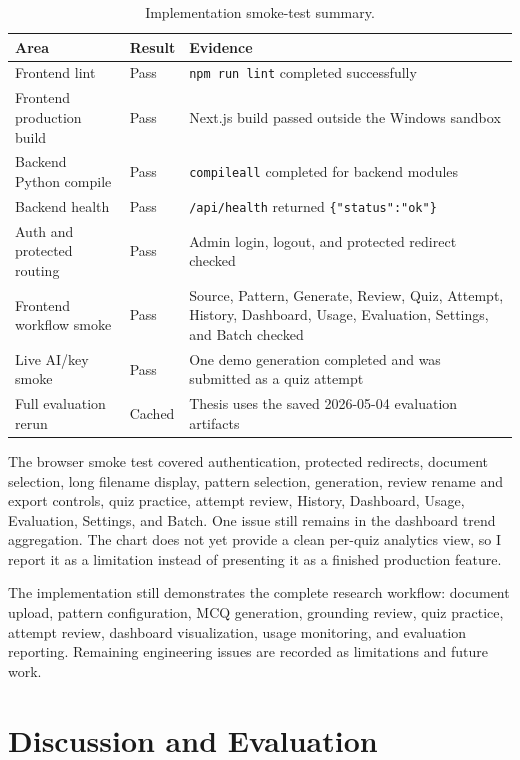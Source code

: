 \documentclass[12pt,a4paper]{article}
\begin{document}
\begin{table}[H]
  \centering
  \singlespacing
  \caption{Implementation smoke-test summary.}
  \label{tab:test-summary}
  \small
  \begin{tabular}{@{}p{3.3cm}p{1.8cm}p{8.3cm}@{}}
    \toprule
    \textbf{Area} & \textbf{Result} & \textbf{Evidence} \\
    \midrule
    Frontend lint & Pass & \texttt{npm run lint} completed successfully \\
    Frontend production build & Pass & Next.js build passed outside the Windows sandbox \\
    Backend Python compile & Pass & \texttt{compileall} completed for backend modules \\
    Backend health & Pass & \texttt{/api/health} returned \texttt{\{"status":"ok"\}} \\
    Auth and protected routing & Pass & Admin login, logout, and protected redirect checked \\
    Frontend workflow smoke & Pass & Source, Pattern, Generate, Review, Quiz, Attempt, History, Dashboard, Usage, Evaluation, Settings, and Batch checked \\
    Live AI/key smoke & Pass & One demo generation completed and was submitted as a quiz attempt \\
    Full evaluation rerun & Cached & Thesis uses the saved 2026-05-04 evaluation artifacts \\
    \bottomrule
  \end{tabular}
\end{table}

The browser smoke test covered authentication, protected redirects, document
selection, long filename display, pattern selection, generation, review
rename and export controls, quiz practice, attempt review, History,
Dashboard, Usage, Evaluation, Settings, and Batch. One issue still remains
in the dashboard trend aggregation. The chart does not yet provide a clean
per-quiz analytics view, so I report it as a limitation instead of
presenting it as a finished production feature.

The implementation still demonstrates the complete research workflow:
document upload, pattern configuration, MCQ generation, grounding review,
quiz practice, attempt review, dashboard visualization, usage monitoring,
and evaluation reporting. Remaining engineering issues are recorded as
limitations and future work.

\clearpage
\section{Discussion and Evaluation}
\end{document}
